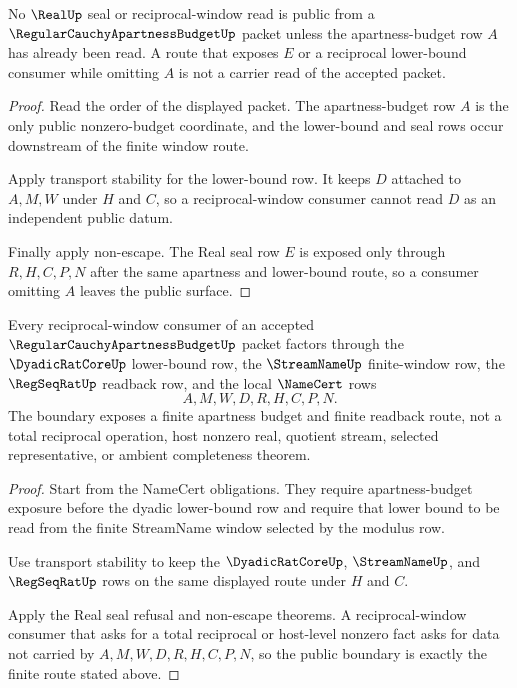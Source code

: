 \begin{theorem}
\label{thm:regular-cauchy-apartness-budget-real-seal-refusal}
No $\RealUp$ seal or reciprocal-window read is public from a $\RegularCauchyApartnessBudgetUp$ packet unless the apartness-budget row $A$ has already been read. A route that exposes $E$ or a reciprocal lower-bound consumer while omitting $A$ is not a carrier read of the accepted packet.
\end{theorem}
\begin{proof}
Read the order of the displayed packet. The apartness-budget row $A$ is the only public nonzero-budget coordinate, and the lower-bound and seal rows occur downstream of the finite window route.

Apply transport stability for the lower-bound row. It keeps $D$ attached to $A,M,W$ under $H$ and $C$, so a reciprocal-window consumer cannot read $D$ as an independent public datum.

Finally apply non-escape. The Real seal row $E$ is exposed only through $R,H,C,P,N$ after the same apartness and lower-bound route, so a consumer omitting $A$ leaves the public surface.
\end{proof}

\begin{theorem}
\label{thm:regular-cauchy-apartness-budget-reciprocal-window-boundary}
Every reciprocal-window consumer of an accepted $\RegularCauchyApartnessBudgetUp$ packet factors through the $\DyadicRatCoreUp$ lower-bound row, the $\StreamNameUp$ finite-window row, the $\RegSeqRatUp$ readback row, and the local $\NameCert$ rows
$$
A,M,W,D,R,H,C,P,N.
$$
The boundary exposes a finite apartness budget and finite readback route, not a total reciprocal operation, host nonzero real, quotient stream, selected representative, or ambient completeness theorem.
\end{theorem}
\begin{proof}
Start from the NameCert obligations. They require apartness-budget exposure before the dyadic lower-bound row and require that lower bound to be read from the finite StreamName window selected by the modulus row.

Use transport stability to keep the $\DyadicRatCoreUp$, $\StreamNameUp$, and $\RegSeqRatUp$ rows on the same displayed route under $H$ and $C$.

Apply the Real seal refusal and non-escape theorems. A reciprocal-window consumer that asks for a total reciprocal or host-level nonzero fact asks for data not carried by $A,M,W,D,R,H,C,P,N$, so the public boundary is exactly the finite route stated above.
\end{proof}

